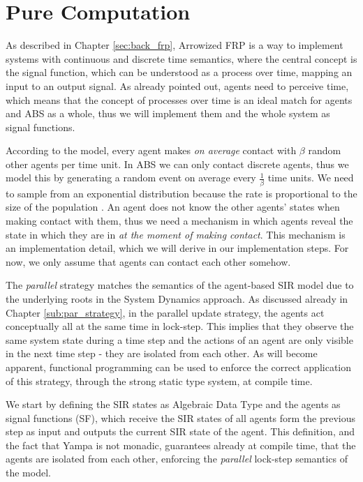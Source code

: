 \section{Pure Computation}
\label{sec:timedriven_firststep}
As described in Chapter \ref{sec:back_frp}, Arrowized FRP \cite{hughes_generalising_2000} is a way to implement systems with continuous and discrete time semantics, where the central concept is the signal function, which can be understood as a process over time, mapping an input to an output signal. As already pointed out, agents need to perceive time, which means that the concept of processes over time is an ideal match for agents and ABS as a whole, thus we will implement them and the whole system as signal functions.

According to the model, every agent makes \textit{on average} contact with $\beta$ random other agents per time unit. In ABS we can only contact discrete agents, thus we model this by generating a random event on average every $\frac{1}{\beta}$ time units. We need to sample from an exponential distribution because the rate is proportional to the size of the population \cite{borshchev_system_2004}. An agent does not know the other agents' states when making contact with them, thus we need a mechanism in which agents reveal the state in which they are in \textit{at the moment of making contact}. This mechanism is an implementation detail, which we will derive in our implementation steps. For now, we only assume that agents can contact each other somehow.

The \textit{parallel} strategy matches the semantics of the agent-based SIR model due to the underlying roots in the System Dynamics approach. As discussed already in Chapter \ref{sub:par_strategy}, in the parallel update strategy, the agents act conceptually all at the same time in lock-step. This implies that they observe the same system state during a time step and the actions of an agent are only visible in the next time step - they are isolated from each other. As will become apparent, functional programming can be used to enforce the correct application of this strategy, through the strong static type system, at compile time.

We start by defining the SIR states as Algebraic Data Type and the agents as signal functions (SF), which receive the SIR states of all agents form the previous step as input and outputs the current SIR state of the agent. This definition, and the fact that Yampa is not monadic, guarantees already at compile time, that the agents are isolated from each other, enforcing the \textit{parallel} lock-step semantics of the model.

